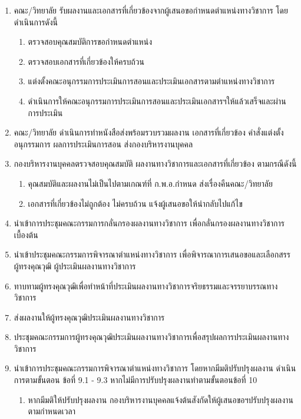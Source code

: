 \begin{enumerate}
\item คณะ/วิทยาลัย รับผลงานและเอกสารที่เกี่ยวข้องจากผู้เสนอขอกำหนดตำแหน่งทางวิชาการ โดยดำเนินการดังนี้
\begin{enumerate}[label=1.\arabic*,leftmargin=0.7cm, labelsep=2mm]
\item ตรวจสอบคุณสมบัติการขอกำหนดตำแหน่ง
\item ตรวจสอบเอกสารที่เกี่ยวข้องให้ครบถ้วน
\item แต่งตั้งคณะอนุกรรมการประเมินการสอนและประเมินเอกสารตามตำแหน่งทางวิชาการ
\item ดำเนินการให้คณะอนุกรรมการประเมินการสอนและประเมินเอกสารฯให้แล้วเสร็จและผ่าน
การประเมิน
\end{enumerate}
\item คณะ/วิทยาลัย ดำเนินการทำหนังสือส่งพร้อมรวบรวมผลงาน  เอกสารที่เกี่ยวข้อง คำสั่งแต่งตั้งอนุกรรมการ  ผลการประเมินการสอน ส่งกองบริหารงานบุคคล
\item กองบริหารงานบุคคลตรวจสอบคุณสมบัติ ผลงานทางวิชาการและเอกสารที่เกี่ยวข้อง ตามกรณีดังนี้
\begin{enumerate}[label=3.\arabic*,leftmargin=0.7cm, labelsep=2mm]
\item คุณสมบัติและผลงานไม่เป็นไปตามเกณฑ์ที่ ก.พ.อ.กำหนด ส่งเรื่องคืนคณะ/วิทยาลัย
\item เอกสารที่เกี่ยวข้องไม่ถูกต้อง ไม่ครบถ้วน แจ้งผู้เสนอขอให้นำกลับไปแก้ไข
\end{enumerate}
\item นำเข้าการประชุมคณะกรรมการกลั่นกรองผลงานทางวิชาการ เพื่อกลั่นกรองผลงานทางวิชาการเบื้องต้น
\item นำเข้าประชุมคณะกรรมการพิจารณาตำแหน่งทางวิชาการ เพื่อพิจารณาการเสนอขอและเลือกสรรผู้ทรงคุณวุฒิ ผู้ประเมินผลงานทางวิชาการ
\item ทาบทามผู้ทรงคุณวุฒิเพื่อทำหน้าที่ประเมินผลงานทางวิชาการจริยธรรมและจรรยาบรรณทางวิชาการ
\item ส่งผลงานให้ผู้ทรงคุณวุฒิประเมินผลงานทางวิชาการ
\item ประชุมคณะกรรมการผู้ทรงคุณวุฒิประเมินผลงานทางวิชาการเพื่อสรุปผลการประเมินผลงานทางวิชาการ
\item นำเข้าการประชุมคณะกรรมการพิจารณาตำแหน่งทางวิชาการ โดยหากมีมติปรับปรุงผลงาน ดำเนินการตามขั้นตอน ข้อที่ 9.1 - 9.3 หากไม่มีการปรับปรุงผลงานทำตามขั้นตอนข้อที่ 10
\begin{enumerate}[label=9.\arabic*,leftmargin=0.7cm, labelsep=2mm]
\item หากมีมติให้ปรับปรุงผลงาน กองบริหารงานบุคคลแจ้งต้นสังกัดให้ผู้เสนอขอฯปรับปรุงผลงาน 
ตามกำหนดเวลา

\end{enumerate}
\end{enumerate}
